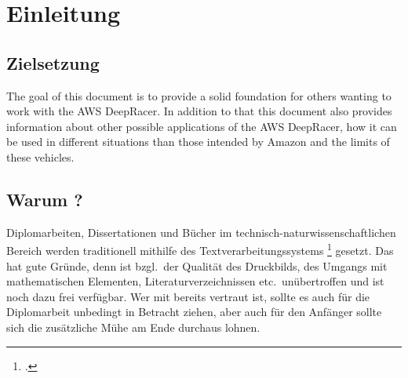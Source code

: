 \chapter{Einleitung}
\label{cha:Einleitung}

\section{Zielsetzung}
%

The goal of this document is to provide a solid foundation for others wanting to work with the AWS DeepRacer. In addition to that this document also provides information about other possible applications of the AWS DeepRacer, how it can be used in different situations than those intended by Amazon and the limits of these vehicles.




\section{Warum {\latex}?}

Diplomarbeiten, Dissertationen und Bücher im
technisch-natur\-wissen\-schaft\-lichen Bereich werden
traditionell mithilfe des Textverarbeitungssystems \latex
\footcite{Lamport94,Lamport95} gesetzt. Das hat gute Gründe, denn
\latex ist bzgl.\ der Qualität des Druckbilds, des Umgangs mit
mathematischen Elementen, Literaturverzeichnissen etc.\
unübertroffen und ist noch dazu frei verfügbar. Wer mit \latex
bereits vertraut ist, sollte es auch für die Diplomarbeit
unbedingt in Betracht ziehen, aber auch für den Anfänger sollte
sich die zusätzliche Mühe am Ende durchaus lohnen.

